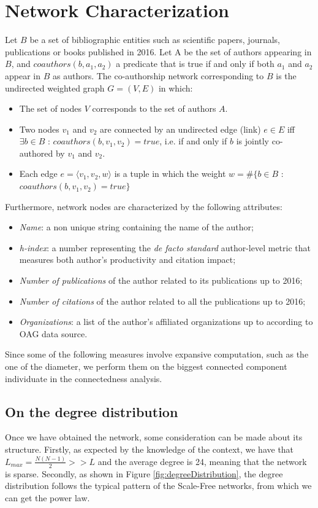 \documentclass[sigchi]{acmart}
\begin{document}
\section{Network Characterization}\label{sec:networkCharacterization}
Let $B$ be a set of bibliographic entities such as scientific papers, journals, publications or books published in 2016. Let A be the set of authors appearing in $B$, and $coauthors(b, a_1, a_2)$ a predicate that is true if and only if both $a_1$ and $a_2$ appear in $B$ as authors. The co-authorship network corresponding to $B$ is the undirected weighted graph $G=(V, E)$ in which:
\begin{itemize}
    \item The set of nodes $V$ corresponds to the set of authors $A$.
    \item Two nodes $v_1$ and $v_2$ are connected by an undirected edge (link) $e \in E$ iff $ \exists b \in B$ : $coauthors(b, v_1, v_2) = true$, i.e. if and only if $b$ is jointly co-authored by $v_1$ and $v_2$.
    \item Each edge $e= \langle v_1,v_2,w \rangle$ is a tuple in which the weight $w = \# \{b \in B$ : $coauthors(b, v_1, v_2) = true\}$
\end{itemize}
Furthermore, network nodes are characterized by the following attributes:  \\
\begin{itemize}
    \item \textit{Name}: a non unique string containing the name of the author;
    \item \textit{h-index}: a number representing the \textit{de facto standard} author-level metric that measures both author's productivity and citation impact;
    \item \textit{Number of publications} of the author related to its publications up to 2016;
    \item \textit{Number of citations} of the author related to all the publications up to 2016;
    \item \textit{Organizations}: a list of the author's affiliated organizations up to according to OAG data source.
\end{itemize}

Since some of the following measures involve expansive computation, such as the one of the diameter, we perform them on the biggest connected component individuate in the connectedness analysis.

\subsection{On the degree distribution}
Once we have obtained the network, some consideration can be made about its structure. Firstly, as expected by the knowledge of the context, we have that $L_{max} = \frac{N(N-1)}{2} >> L$ and the average degree is 24, meaning that the network is sparse. 
Secondly, as shown in Figure \ref{fig:degreeDistribution}, the degree distribution follows the typical pattern of the Scale-Free networks, from which we can get the power law.
\end{document}
